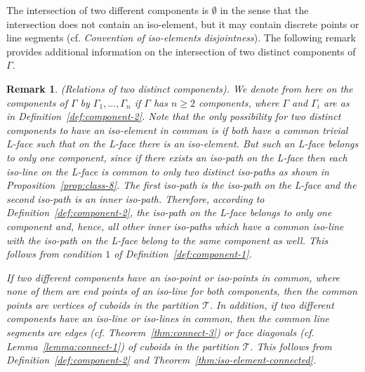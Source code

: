 \documentclass[a4paper,11pt]{article}
\newtheorem{remark}[theorem]{Remark}
\begin{document}
The intersection of two different components is $\emptyset$ in the sense that the intersection does not
contain an iso-element, but it may contain discrete points or line segments (cf. {\it Convention of
iso-elements disjointness}). The following remark provides additional information on the intersection
of two distinct components of $\Gamma$.

\begin{remark}(Relations of two distinct components).
We denote from here on the components of $\Gamma$ by $\Gamma_1,\ldots,\Gamma_n$ if $\Gamma$ has $n\geq 2$
components, where $\Gamma$ and $\Gamma_i$ are as in Definition~\ref{def:component-2}. Note that the only
possibility for two distinct components to have an iso-element in common is if both have a common trivial L-face
such that on the L-face there is an iso-element. But such an L-face belongs to only one component, since if there
exists an iso-path on the L-face then each iso-line on the L-face is common to only two distinct iso-paths as
shown in Proposition~\ref{prop:class-8}. The first iso-path is the iso-path on the L-face and the second iso-path
is an inner iso-path. Therefore, according to Definition~\ref{def:component-2}, the iso-path on the L-face belongs
to only one component and, hence, all other inner iso-paths which have a common iso-line with the iso-path on the
L-face belong to the same component as well. This follows from condition $1$ of Definition~\ref{def:component-1}.

If two different components have an iso-point or iso-points in common, where none of them are end points of
an iso-line for both components, then the common points are vertices of cuboids in the partition $\mathcal{T}$.
In addition, if two different components have an iso-line or iso-lines in common, then the common line segments
are edges (cf. Theorem~\ref{thm:connect-3}) or face diagonals (cf. Lemma~\ref{lemma:connect-1}) of cuboids in the
partition $\mathcal{T}$. This follows from Definition~\ref{def:component-2} and
Theorem~\ref{thm:iso-element-connected}.
\end{remark}
\end{document}

